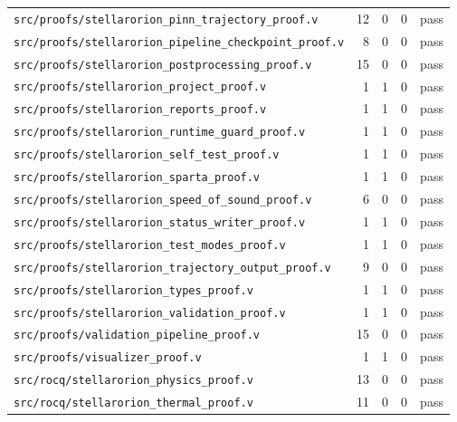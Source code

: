 \documentclass[11pt]{article}
\theoremstyle{definition}
\begin{document}
\begin{longtable}{@{}lrrrl@{}}
\texttt{src/proofs/stellarorion\_pinn\_trajectory\_proof.v} & 12 & 0 & 0 & pass \\
\texttt{src/proofs/stellarorion\_pipeline\_checkpoint\_proof.v} & 8 & 0 & 0 & pass \\
\texttt{src/proofs/stellarorion\_postprocessing\_proof.v} & 15 & 0 & 0 & pass \\
\texttt{src/proofs/stellarorion\_project\_proof.v} & 1 & 1 & 0 & pass \\
\texttt{src/proofs/stellarorion\_reports\_proof.v} & 1 & 1 & 0 & pass \\
\texttt{src/proofs/stellarorion\_runtime\_guard\_proof.v} & 1 & 1 & 0 & pass \\
\texttt{src/proofs/stellarorion\_self\_test\_proof.v} & 1 & 1 & 0 & pass \\
\texttt{src/proofs/stellarorion\_sparta\_proof.v} & 1 & 1 & 0 & pass \\
\texttt{src/proofs/stellarorion\_speed\_of\_sound\_proof.v} & 6 & 0 & 0 & pass \\
\texttt{src/proofs/stellarorion\_status\_writer\_proof.v} & 1 & 1 & 0 & pass \\
\texttt{src/proofs/stellarorion\_test\_modes\_proof.v} & 1 & 1 & 0 & pass \\
\texttt{src/proofs/stellarorion\_trajectory\_output\_proof.v} & 9 & 0 & 0 & pass \\
\texttt{src/proofs/stellarorion\_types\_proof.v} & 1 & 1 & 0 & pass \\
\texttt{src/proofs/stellarorion\_validation\_proof.v} & 1 & 1 & 0 & pass \\
\texttt{src/proofs/validation\_pipeline\_proof.v} & 15 & 0 & 0 & pass \\
\texttt{src/proofs/visualizer\_proof.v} & 1 & 1 & 0 & pass \\
\texttt{src/rocq/stellarorion\_physics\_proof.v} & 13 & 0 & 0 & pass \\
\texttt{src/rocq/stellarorion\_thermal\_proof.v} & 11 & 0 & 0 & pass \\
\end{longtable}
\endgroup
\end{document}
